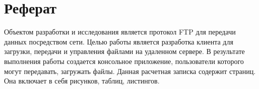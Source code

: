 \section{Реферат}
Объектом разработки и исследования является протокол FTP для передачи данных посредством сети. 
Целью работы является разработка клиента для загрузки, передачи и управления файлами на удаленном сервере.
В результате выполнения работы создается консольное приложение, пользователи которого могут передавать, загружать файлы.
Данная расчетная записка содержит {} страниц. Она включает в себя {} рисунков, {} таблиц, {} листингов. 
